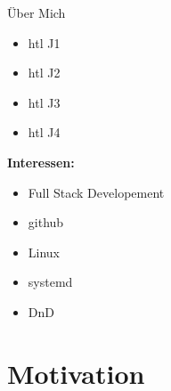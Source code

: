 \documentclass[10pt, unknownkeysallowed]{beamer}
\begin{document}
\begin{frame}{Über Mich}
\begin{minipage}{.45\textwidth}
	\begin{itemize}
	    \item htl J1
		\item htl J2
		\item htl J3
		\item htl J4
	\end{itemize}
	\textbf{Interessen:}
	\begin{itemize}
	    \item Full Stack Developement
		\item github
		\item Linux
		\item systemd
		\item DnD
	\end{itemize}
\end{minipage}
\end{frame}



\section{Motivation}
\end{document}
